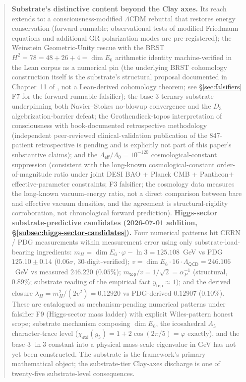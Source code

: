 \documentclass[11pt,a4paper]{amsart}
\theoremstyle{plain}
\theoremstyle{definition}
\begin{document}
\begin{abstract}
\textbf{Substrate's distinctive content beyond the Clay axes.} Its reach extends to: a consciousness-modified $\Lambda$CDM rebuttal that restores energy conservation (forward-runnable; observational tests of modified Friedmann equations and additional GR polarization modes are pre-registered); the Weinstein Geometric-Unity rescue with the BRST $H^2 = 78 = 48 + 26 + 4 = \dim E_6$ arithmetic identity machine-verified in the Lean corpus as a numerical pin (the underlying BRST cohomology construction itself is the substrate's structural proposal documented in Chapter~11 of \cite{cohen2026book}, not a Lean-derived cohomology theorem; see \S\ref{sec:falsifiers} F7 for the forward-runnable falsifier); the base-3 ternary substrate underpinning both Navier--Stokes no-blowup convergence and the $D_3$ algebrization-barrier defeat; the Grothendieck-topos interpretation of consciousness with book-documented retrospective methodology (independent peer-reviewed clinical-validation publication of the 847-patient retrospective is pending and is explicitly not part of this paper's substantive claims); and the $\Lambda_{\textsf{eff}}/\Lambda_0 = 10^{-120}$ cosmological-constant suppression (consistent with the long-known cosmological-constant order-of-magnitude ratio under joint DESI BAO + Planck CMB + Pantheon$+$ effective-parameter constraints; F3 falsifier; the cosmology data measures the long-known vacuum-energy ratio, not a direct comparison between bare and effective vacuum densities, and the agreement is structural-rigidity corroboration, not chronological forward prediction). \textbf{Higgs-sector substrate-predictive candidates (2026-07-01 addition, \S\ref{subsec:higgs-sector-candidates}).} Four numerical patterns hit CERN / PDG measurements within measurement error using only substrate-load-bearing ingredients: $m_H = \dim E_6 \cdot \varphi - \ln 3 = 125.108$~GeV vs PDG $125.10 \pm 0.14$ ($0.06\sigma$, 30-digit-verified); $v = \dim E_6 \cdot 16 \cdot \Lambda_{\textsf{QCD}} = 246.106$~GeV vs measured $246.220$ ($0.05\%$); $m_{\textsf{top}}/v = 1/\sqrt{2} = \alpha_P^{-1}$ (structural, $0.89\%$; substrate reading of the empirical fact $y_{\textsf{top}} \approx 1$); and the derived closure $\lambda_H = m_H^2/(2v^2) = 0.12920$ vs PDG-derived $0.12907$ ($0.10\%$). These are catalogued as mechanism-pending numerical patterns under falsifier F9 (Higgs-sector mass ladder) with explicit Wiles-pattern honest scope; substrate mechanism composing $\dim E_6$, the icosahedral $A_5$ character-trace level ($\chi_{\textsf{std}}(g_5) = 1 + 2\cos(2\pi/5) = \varphi$ exactly), and the base-3 $\ln 3$ constant into a physical mass-scale eigenvalue in GeV has not yet been constructed. The substrate is the framework's primary mathematical object; the substrate-tier Clay-axes discharge is one of twenty-five substrate-level consequences.


\end{abstract}
\end{document}
